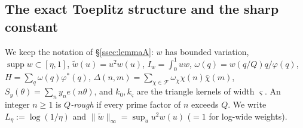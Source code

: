 \providecommand{\cF}{\mathcal{F}}
\providecommand{\sumst}{\sideset{}{^*}\sum}
\providecommand{\Ec}{\mathcal{E}}
\providecommand{\CG}{C_{\mathrm G}}
\providecommand{\Cw}{C_w}
\providecommand{\CT}{C_{\mathrm T}}
\providecommand{\CTp}{C^{+}_{\mathrm T}}
\providecommand{\Tom}{T_\omega}
\providecommand{\muO}{\mu_\Omega}
\providecommand{\Lmult}{\Lambda_{\mathrm{mult}}}
\providecommand{\TT}{\mathbb{T}}
\providecommand{\Wkd}{k_{\varsigma}}
\providecommand{\WIw}{I_w}
\providecommand{\cK}{\mathcal{K}}
\providecommand{\hJ}{\widehat{\mathbf 1_J}}
\providecommand{\ash}{a^\sharp}
\providecommand{\Wnat}{\natural}
\providecommand{\Yc}{Y}

\subsection{The exact Toeplitz structure and the sharp constant}\label{ssec:toeplitz}

We keep the notation of \S\ref{ssec:lemmaA}: $w$ has bounded variation, $\operatorname{supp}w\subset[\eta,1]$,
$\widetilde w(u)=u^2w(u)$, $\WIw=\int_0^1uw$, $\omega(q)=w(q/Q)q/\varphi(q)$, $H=\sum_q\omega(q)\varphi^*(q)$,
$\Delta(n,m)=\sum_{\chi\in\cF}\omega_\chi\chi(n)\bar\chi(m)$, $S_y(\theta)=\sum_ny_ne(n\theta)$,
and $k_0,\Wkd$ are the triangle kernels of width $\varsigma$. An integer $n\ge1$ is \emph{$Q$-rough} if every prime
factor of $n$ exceeds $Q$. We write $L_\eta:=\log(1/\eta)$ and $\|\widetilde w\|_\infty=\sup_uu^2w(u)$ ($=1$ for
log-wide weights).

